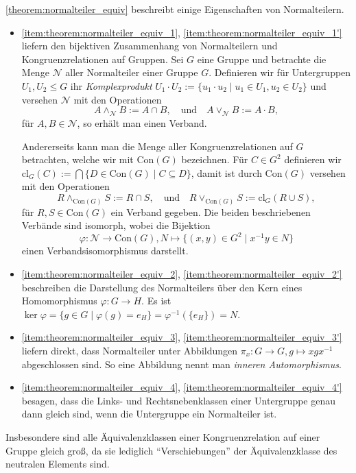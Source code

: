 \begin{remark}
    \cref{theorem:normalteiler_equiv} beschreibt einige Eigenschaften von Normalteilern.
    \begin{itemize}
        \item \ref*{item:theorem:normalteiler_equiv_1}, \ref*{item:theorem:normalteiler_equiv_1'} liefern den bijektiven Zusammenhang von Normalteilern und Kongruenzrelationen auf Gruppen. Sei $G$ eine Gruppe und betrachte die Menge $\mathcal{N}$ aller Normalteiler einer Gruppe $G$. Definieren wir für Untergruppen $U_1, U_2 \leq G$ ihr \emph{Komplexprodukt} $U_1 \cdot U_2 := \{ u_1 \cdot u_2 \mid u_1 \in U_1, u_2 \in U_2 \}$ und versehen $\mathcal{N}$ mit den Operationen
        $$ A\land_\mathcal{N} B:=A\cap B, \quad \textrm{und} \quad A\lor_\mathcal{N} B:=A\cdot B, $$
        für $A, B \in \mathcal{N}$, so erhält man einen Verband.
        
        Andererseits kann man die Menge aller Kongruenzrelationen auf $G$ betrachten, welche wir mit $\mathrm{Con}(G)$ bezeichnen. Für $C \in G^2$ definieren wir $\mathrm{cl}_G(C):=\bigcap\{ D \in \mathrm{Con}(G) \mid C \subseteq D \}$, damit ist durch $\mathrm{Con}(G)$ versehen mit den Operationen
        $$ R\land_{\mathrm{Con}(G)} S:=R\cap S, \quad \textrm{und} \quad R\lor_{\mathrm{Con}(G)} S:=\mathrm{cl}_G(R\cup S), $$ 
        für $R, S \in \mathrm{Con}(G)$ ein Verband gegeben. Die beiden beschriebenen Verbände sind isomorph, wobei die Bijektion
        $$ \varphi : \mathcal{N} \to \mathrm{Con}(G), N \mapsto \{ (x, y) \in G^2 \mid x^{-1} y \in N \} $$
        einen Verbandsisomorphismus darstellt.
        
        \item \ref*{item:theorem:normalteiler_equiv_2}, \ref*{item:theorem:normalteiler_equiv_2'} beschreiben die Darstellung des Normalteilers über den Kern eines Homomorphismus $\varphi: G \to H$. Es ist $\ker \varphi = \{g \in G \mid \varphi(g) = e_H\} = \varphi^{-1}(\{e_H\}) = N$.
        \item \ref*{item:theorem:normalteiler_equiv_3}, \ref*{item:theorem:normalteiler_equiv_3'} liefern direkt, dass Normalteiler unter Abbildungen $\pi_x: G \to G, g \mapsto xgx^{-1}$ abgeschlossen sind. So eine Abbildung nennt man \emph{inneren Automorphismus}.
        \item \ref*{item:theorem:normalteiler_equiv_4}, \ref*{item:theorem:normalteiler_equiv_4'} besagen, dass die Links- und Rechtsnebenklassen einer Untergruppe genau dann gleich sind, wenn die Untergruppe ein Normalteiler ist.
    \end{itemize}

    Insbesondere sind alle Äquivalenzklassen einer Kongruenzrelation auf einer Gruppe gleich groß, da sie lediglich ``Verschiebungen'' der Äquivalenzklasse des neutralen Elements sind.
\end{remark}

